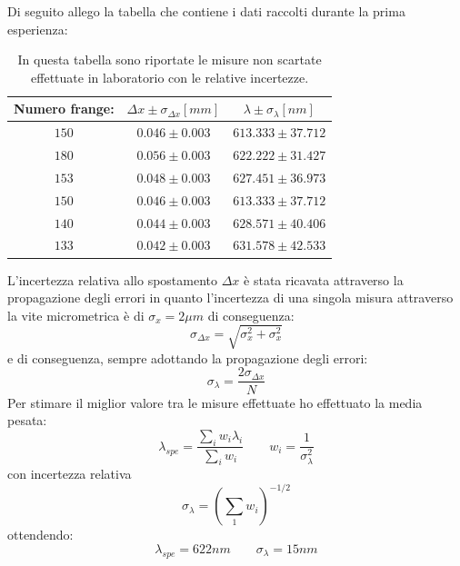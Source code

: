 \documentclass[11pt]{article}
\begin{document}
Di seguito allego la tabella che contiene i dati raccolti durante la prima esperienza:
\begin{table}[H]
    \centering
    \begin{tabular}{|c|c|c|}
    \hline
     Numero frange:  & $\Delta x\pm \sigma_{\Delta x} [mm]$ & $ \lambda \pm \sigma_\lambda  [nm]$\\
    \hline
    $150$ & $0.046 \pm 0.003$ & $613.333 \pm 37.712$ \\
    \hline
    $180$ & $0.056 \pm 0.003$ & $622.222 \pm 31.427$ \\
    \hline
    $153$ & $0.048\pm 0.003$ & $627.451 \pm 36.973$ \\
    \hline
    $150$ & $0.046\pm 0.003$ & $613.333 \pm 37.712$ \\
    \hline
    $140$ & $0.044\pm 0.003$ & $628.571 \pm 40.406$ \\
    \hline
    $133$ & $0.042\pm 0.003$ & $631.578 \pm 42.533$ \\
    \hline
    \end{tabular}
    \caption{In questa tabella sono riportate le misure non scartate effettuate in laboratorio con le relative incertezze.}
    \label{L'unghezza d'onda}
\end{table}
L'incertezza relativa allo spostamento $\Delta x$ è stata ricavata attraverso la propagazione degli errori in quanto l'incertezza di una singola misura attraverso la vite micrometrica è di $\sigma_x = 2 \mu m$ di conseguenza: 
\begin{equation}
 \sigma_{\Delta x}= \sqrt{\sigma_x ^2 + \sigma_x ^2}
 \label{posizione}
\end{equation}
e di conseguenza, sempre adottando la propagazione degli errori:
\begin{equation}
    \sigma_\lambda = \frac{2\sigma_{\Delta x}}{N}
\end{equation}
Per stimare il miglior valore tra le misure effettuate ho effettuato la media pesata:
\begin{equation}
    \lambda_{spe}=\frac{\sum_{i} w_i \lambda_i }{\sum_{i} w_i} \qquad w_i= \frac{1}{\sigma_{\lambda}^2}
    \label{media}
\end{equation}
con incertezza relativa
\begin{equation}
    \sigma_{\lambda}=\left(\sum_{1} w_i \right)^{-1/2}
    \label{peso}
\end{equation}
ottendendo:
\begin{equation}
    \nonumber
    \lambda_{spe}= 622 nm \qquad \sigma_\lambda= 15 nm
\end{equation}
\end{document}
